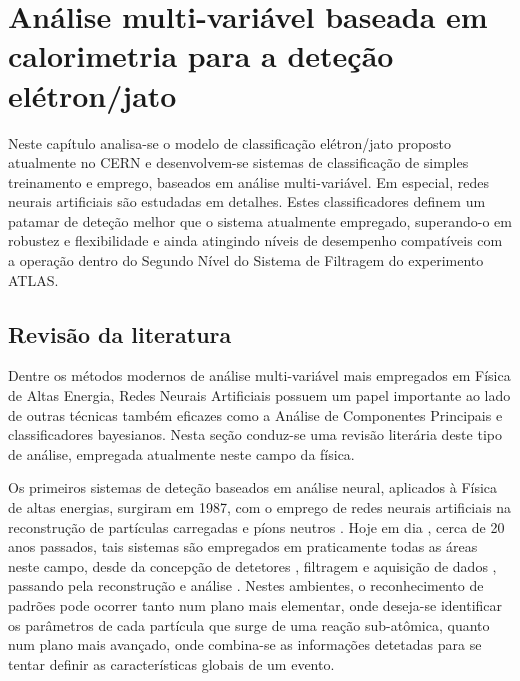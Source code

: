 \typeout{ ====================================================================}
\typeout{ ====================================================================}

\chapter{Análise multi-variável baseada em calorimetria para a deteção
elétron/jato} 
\label{chap:neural}

Neste capítulo analisa-se o modelo de classificação elétron/jato proposto
atualmente no CERN e desenvolvem-se sistemas de classificação de simples
treinamento e emprego, baseados em análise multi-variável. Em especial, redes
neurais artificiais são estudadas em detalhes. Estes classificadores definem
um patamar de deteção melhor que o sistema atualmente empregado, superando-o
em robustez e flexibilidade e ainda atingindo níveis de desempenho compatíveis
com a operação dentro do Segundo Nível do Sistema de Filtragem do experimento
ATLAS.

\section{Revisão da literatura}
\label{sec:review}

Dentre os métodos modernos de análise multi-variável mais empregados em Física
de Altas Energia, Redes Neurais Artificiais possuem um papel importante ao
lado de outras técnicas também eficazes como a Análise de Componentes
Principais e classificadores bayesianos. Nesta seção conduz-se uma revisão
literária deste tipo de análise, empregada atualmente neste campo da física.

Os primeiros sistemas de deteção baseados em análise neural, aplicados à
Física de altas energias, surgiram em 1987, com o emprego de redes neurais
artificiais na reconstrução de partículas carregadas e píons neutros
\cite{denby-nim-1997}. Hoje em dia \cite{denby-nim-2004}, cerca de 20 anos
passados, tais sistemas são empregados em praticamente todas as áreas neste
campo, desde da concepção de detetores \cite{wilk-nim-2006}, filtragem e
aquisição de dados \cite{denby-nim-2003, kohne-nim-1997, varela-cms-1998},
passando pela reconstrução  \cite{peterson-nim-1988} e análise
\cite{kiesling-nim-2004, bhat-api-1995}. Nestes ambientes, o reconhecimento de
padrões pode ocorrer tanto num plano mais elementar, onde deseja-se
identificar os parâmetros de cada partícula que surge de uma reação
sub-atômica, quanto num plano mais avançado, onde combina-se as informações
detetadas para se tentar definir as características globais de um evento.

